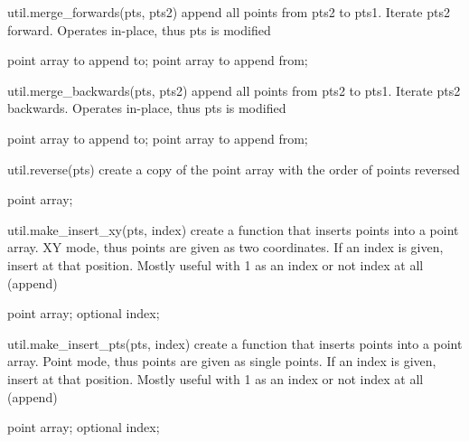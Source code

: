 \begin{APIfunc}{util.merge\_forwards(pts, pts2)}
    append all points from pts2 to pts1. Iterate pts2 forward. Operates in-place, thus pts is modified
    \begin{APIparameters}
            point array to append to;
            point array to append from;
    \end{APIparameters}
\end{APIfunc}
\begin{APIfunc}{util.merge\_backwards(pts, pts2)}
    append all points from pts2 to pts1. Iterate pts2 backwards. Operates in-place, thus pts is modified
    \begin{APIparameters}
            point array to append to;
            point array to append from;
    \end{APIparameters}
\end{APIfunc}
\begin{APIfunc}{util.reverse(pts)}
    create a copy of the point array with the order of points reversed
    \begin{APIparameters}
            point array;
    \end{APIparameters}
\end{APIfunc}
\begin{APIfunc}{util.make\_insert\_xy(pts, index)}
    create a function that inserts points into a point array. XY mode, thus points are given as two coordinates. If an index is given, insert at that position. Mostly useful with 1 as an index or not index at all (append)
    \begin{APIparameters}
            point array;
            optional index;
    \end{APIparameters}
\end{APIfunc}
\begin{APIfunc}{util.make\_insert\_pts(pts, index)}
    create a function that inserts points into a point array. Point mode, thus points are given as single points. If an index is given, insert at that position. Mostly useful with 1 as an index or not index at all (append)
    \begin{APIparameters}
            point array;
            optional index;
    \end{APIparameters}
\end{APIfunc}
